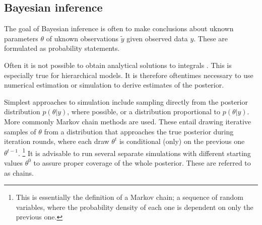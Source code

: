 


\subsection{Bayesian inference}\label{simulation}

The goal of Bayesian inference is often to make conclusions about uknown
parameters $\theta$ of uknown observations $\tilde{y}$ given observed data
$y$. These are formulated as probability statements.

Often it is not possible to obtain analytical solutions to integrals
. This is especially true for hierarchical models. It is therefore
oftentimes necessary to use numerical estimation or simulation to
derive estimates of the posterior.



Simplest approaches to simulation include sampling directly from the posterior
distribution $p(\theta|y)$, where possible, or a distribution proportional
to $p(\theta|y)$. More commonly Markov chain methods are used. These entail
drawing iterative samples of $\theta$ from a distribution that approaches
the true posterior during iteration rounds, where each draw $\theta^t$ is
conditional (only) on the previous one $\theta^{t-1}$.
\footnote{This is essentially the definition of a Markov chain; a sequence of random
variables, where the probability density of each one is dependent on only the
previous one.} It is advisable to run several separate simulations with
different starting values $\theta^0$ to assure proper coverage of the whole
posterior. These are referred to as chains.

